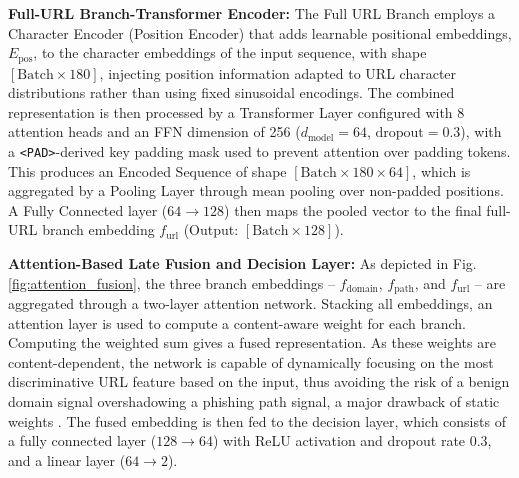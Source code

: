 \documentclass[conference]{IEEEtran}
\begin{document}

    \item \textbf{Full-URL Branch-Transformer Encoder:} The Full URL Branch employs a Character Encoder (Position Encoder) that adds learnable positional embeddings, $E_{\text{pos}}$, to the character embeddings of the input sequence, with shape $[\text{Batch} \times 180]$, injecting position information adapted to URL character distributions rather than using fixed sinusoidal encodings. The combined representation is then processed by a Transformer Layer configured with 8 attention heads and an FFN dimension of 256 ($d_{\text{model}} = 64$, $\text{dropout} = 0.3$), with a \texttt{<PAD>}-derived key padding mask used to prevent attention over padding tokens. This produces an Encoded Sequence of shape $[\text{Batch} \times 180 \times 64]$, which is aggregated by a Pooling Layer through mean pooling over non-padded positions. A Fully Connected layer ($64 \rightarrow 128$) then maps the pooled vector to the final full-URL branch embedding $f_{\text{url}}$ (Output: $[\text{Batch} \times 128]$).
    

    \item \textbf{Attention-Based Late Fusion and Decision Layer:} As depicted in Fig. \ref{fig:attention_fusion}, the three branch embeddings – $f_{\text{domain}}$, $f_{\text{path}}$, and $f_{\text{url}}$ – are aggregated through a two-layer attention network. Stacking all embeddings, an attention layer is used to compute a content-aware weight for each branch. Computing the weighted sum gives a fused representation. As these weights are content-dependent, the network is capable of dynamically focusing on the most discriminative URL feature based on the input, thus avoiding the risk of a benign domain signal overshadowing a phishing path signal, a major drawback of static weights \cite{Maneriker}. The fused embedding is then fed to the decision layer, which consists of a fully connected layer ($128 \rightarrow 64$) with ReLU activation and dropout rate 0.3, and a linear layer ($64 \rightarrow 2$).
\end{document}
